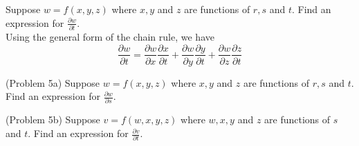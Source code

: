 \documentclass[handout]{ximera}
\begin{document}
\begin{example}[Example 5]
Suppose $w = f(x, y, z)$ where $x, y$ and $z$ are functions of $r, s$ and $t$. Find an expression for $\frac{\partial w}{\partial t}$.\\
Using the general form of the chain rule, we have
\[
\frac{\partial w}{\partial t}= \frac{\partial w}{\partial x}\frac{\partial x}{\partial t}+\frac{\partial w}{\partial y}\frac{\partial y}{\partial t}
+\frac{\partial w}{\partial z}\frac{\partial z}{\partial t}
\]
\end{example}

\begin{problem}(Problem 5a)
Suppose $w = f(x, y, z)$ where $x, y$ and $z$ are functions of $r, s$ and $t$. Find an expression for $\frac{\partial w}{\partial s}$.
\end{problem}

\begin{problem}(Problem 5b)
Suppose $v = f(w, x, y, z)$ where $w, x, y$ and $z$ are functions of $s$ and $t$. Find an expression for $\frac{\partial v}{\partial t}$.
\end{problem}
\end{document}

